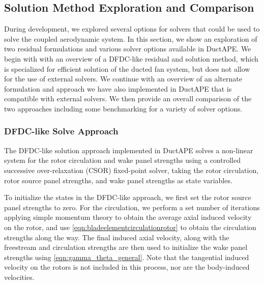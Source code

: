 \subsection{Solution Method Exploration and Comparison}
\label{ssec:solvers}

During development, we explored several options for solvers that could be used to solve the coupled aerodynamic system.
%
In this section, we show an exploration of two residual formulations and various solver options available in DuctAPE. %
%
We begin with with an overview of a DFDC-like residual and solution method, which is specialized for efficient solution of the ducted fan system, but does not allow for the use of external solvers.
%
We continue with an overview of an alternate formulation and approach we have also implemented in DuctAPE that is compatible with external solvers.
%
We then provide an overall comparison of the two approaches including some benchmarking for a variety of solver options.

\subsubsection{DFDC-like Solve Approach}

The DFDC-like solution approach implemented in DuctAPE solves a non-linear system for the rotor circulation and wake panel strengths using a controlled successive over-relaxation (CSOR) fixed-point solver, taking the rotor circulation, rotor source panel strengths, and wake panel strengths as state variables.


To initialize the states in the DFDC-like approach, we first set the rotor source panel strengths to zero.
%
For the circulation, we perform a set number of iterations applying simple momentum theory to obtain the average axial induced velocity on the rotor, and use \cref{eqn:bladeelementcirculationrotor} to obtain the circulation strengths along the way.
%
The final induced axial velocity, along with the freestream and circulation strengths are then used to initialize the wake panel strengths using \cref{eqn:gamma_theta_general}.
%
Note that the tangential induced velocity on the rotors is not included in this process, nor are the body-induced velocities.


